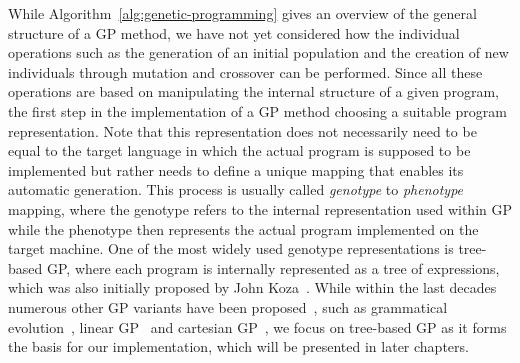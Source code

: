While Algorithm~\ref{alg:genetic-programming} gives an overview of the general structure of a GP method, we have not yet considered how the individual operations such as the generation of an initial population and the creation of new individuals through mutation and crossover can be performed.
Since all these operations are based on manipulating the internal structure of a given program, the first step in the implementation of a GP method choosing a suitable program representation.
Note that this representation does not necessarily need to be equal to the target language in which the actual program is supposed to be implemented but rather needs to define a unique mapping that enables its automatic generation.
This process is usually called \emph{genotype} to \emph{phenotype} mapping, where the genotype refers to the internal representation used within GP while the phenotype then represents the actual program implemented on the target machine.
One of the most widely used genotype representations is tree-based GP, where each program is internally represented as a tree of expressions, which was also initially proposed by John Koza~\cite{koza1994genetic}.
While within the last decades numerous other GP variants have been proposed~\cite{poli2008field}, such as grammatical evolution~\cite{o2001grammatical}, linear GP~\cite{brameier2007linear} and cartesian GP~\cite{miller2008cartesian}, we focus on tree-based GP as it forms the basis for our implementation, which will be presented in later chapters.
